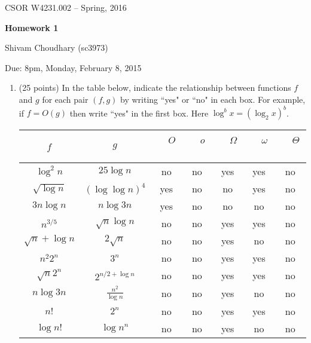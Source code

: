 \documentclass[11pt]{article}
\begin{document}
\begin{flushleft}
CSOR W4231.002 -- Spring, 2016
\end{flushleft}


 \centerline{\bf Homework 1}
\medskip
\centerline{Shivam Choudhary (sc3973)}
\centerline{Due: 8pm, Monday, February 8, 2015}

\medskip 

\bigskip



\begin{enumerate}

\item(25 points) In the table below, indicate the relationship between functions $f$ and $g$ 
for each pair $(f, g)$  by writing  ``yes" or ``no"  in each box. For example, 
if $f=O(g)$ then write ``yes"  in the first box. Here $\log^b{x} = (\log_2{x})^b$.


\begin{table}[tbh]  
\begin{center}
\begin{tabular}{|c|c|c|c|c|c|c|}\hline  %
$f$ & $g$ & \ \ $O$ \ \  & \ \  $o$ \ \   &  \ \ $\Omega$ \ \  &  \ \ $\omega$ \ \ & \ \ $\Theta$  \ \ \\ \hline
$\log^2{n}$ & $25\log{n}$  &no  &no  &yes    & yes & no \\ \hline
$\sqrt{ \log{n} }$ & $(\log{ \log{n}})^4$  & yes  &no  &no    &  yes&no \\ \hline
$3n \log{n}$ & $n\log{3n}$  &  yes &no  &no    &no  &no \\ \hline
$n^{3/5}$ & $\sqrt{n}\log{n}$  & no  &no  &  yes   &yes  &no \\ \hline
$\sqrt{n} + \log{n}$ & $2\sqrt{n}$  & no  &no   &   yes    & no&    no \\ \hline
$n^2 2^n$ & $3^n$  &no  &no  &  yes  &yes  &no \\ \hline
$\sqrt{n} 2^n$ & $2^{n/2+\log{n}}$  &no &no  &yes    &yes  &no \\ \hline
$n \log{3n}$ & $\frac{n^2}{\log{n} }$  &  no &no  &yes    &no  &no \\ \hline
$n!$ & $2^n$  &no  &no &yes    &yes  &no \\ \hline
$\log{n!}$ & $\log{n^n}$  & no  &no  & yes   &no  &no \\ \hline
\end{tabular}
\end{center}
\end{table} 


\end{enumerate}
\end{document}
